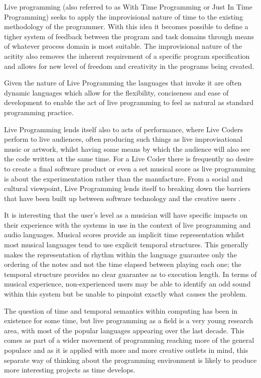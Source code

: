 \documentclass[11pt, abstracton, twoside, titlepage=true]{scrartcl}
\begin{document}
Live programming (also referred to as With Time Programming or Just In Time 
Programming) seeks to apply the improvisional nature of time to the existing 
methodology of the programmer. With this idea it becomes possible to define a 
tigher system of feedback between the program and task domains through means 
of whatever process domain is most suitable. The improvisional nature of the 
acitity also removes the inherent requirement of a specific program 
specification and allows for new level of freedom and creativity in the 
programs being created. 

Given the nature of Live Programming the languages that invoke it are often 
dynamic languages which allow for the flexibility, conciseness and ease of 
development \cite{McD07} to enable the act of live programming to feel as 
natural as standard programming practice.

Live Programming lends itself also to acts of performance, where Live Coders 
perform to live audiences, often producing such things as live 
improvisational music or artwork, whilst having some means by which the 
audience will also see the code written at the same time. For a Live Coder 
there is frequently no desire to create a final software product or even a set 
musical score as live programming is about the experimentation rather than the 
manufacture. From a social and cultural viewpoint, Live Programming lends 
itself to breaking down the barriers that have been built up between software 
technology and the creative users \cite{McL13}.

It is interesting that the user's level as a musician will have specific 
impacts on their experience with the systems in use in the context of live 
programming and audio languages. Musical scores provide an implicit time 
representation whilst most musical languages tend to use explicit temporal 
structures. This generally makes the representation of rhythm within the 
language guarantee only the ordering of the notes and not the time elapsed 
between playing each one; the temporal structure provides no clear guarantee as 
to execution length. In terms of musical experience, non-experienced 
users may be able to identify an odd sound within this system but be unable to 
pinpoint exactly what causes the problem. 

The question of time and temporal semantics within computing has been in 
existence for some time, but live programming as a field is a very young 
research area, with most of the popular languages appearing over the last 
decade. This comes as part of a wider movement of programming reaching more of 
the general populace and as it is applied with more and more creative outlets 
in mind, this separate way of thinking about the programming environment is 
likely to produce more interesting projects as time develops. 
\end{document}
